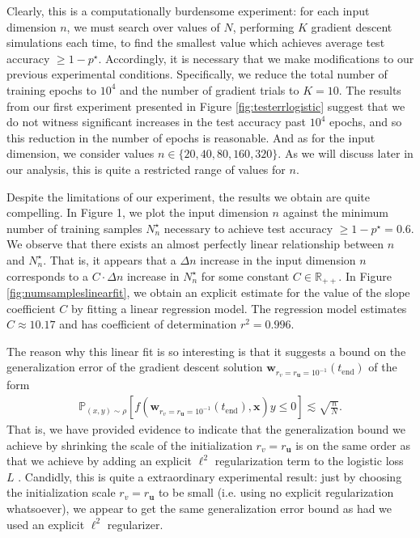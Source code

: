 \documentclass{article}
\begin{document}
Clearly, this is a computationally burdensome experiment: for each input dimension $n$, we must search over values of $N$, performing $K$ gradient descent simulations each time, to find the smallest value which achieves average test accuracy $\geq 1-p^{\star}$. Accordingly, it is necessary that we make modifications to our previous experimental conditions. Specifically, we reduce the total number of training epochs to $10^4$ and the number of gradient trials to $K = 10$. The results from our first experiment presented in Figure \ref{fig:testerrlogistic} suggest that we do not witness significant increases in the test accuracy past $10^4$ epochs, and so this reduction in the number of epochs is reasonable. And as for the input dimension, we consider values $n \in \{20, 40, 80, 160, 320\}$. As we will discuss later in our analysis, this is quite a restricted range of values for $n$.

Despite the limitations of our experiment, the results we obtain are quite compelling. In Figure 1, we plot the input dimension $n$ against the minimum number of training samples $N_n^{\star}$ necessary to achieve test accuracy $\geq 1-p^{\star} = 0.6$. We observe that there exists an almost perfectly linear relationship between $n$ and $N_n^{\star}$. That is, it appears that a $\Delta n$ increase in the input dimension $n$ corresponds to a $C \cdot \Delta n$ increase in $N_n^{\star}$ for some constant $C \in \mathbb{R}_{++}$. In Figure \ref{fig:numsampleslinearfit}, we obtain an explicit estimate for the value of the slope coefficient $C$ by fitting a linear regression model. The regression model estimates $C \approx 10.17$ and has coefficient of determination $r^2 = 0.996$.

The reason why this linear fit is so interesting is that it suggests a bound on the generalization error of the gradient descent solution $\boldsymbol{w}_{r_v = r_{\boldsymbol{u}}= 10^{-1}}(t_{\text{end}})$ of the form 
\begin{align*}
   \mathbb{P}_{(x,y) \sim \rho}[f(\boldsymbol{w}_{r_v = r_{\boldsymbol{u}} = 10^{-1}}(t_{\text{end}}), \boldsymbol{x})y \leq 0] \lesssim \sqrt{\frac{n}{N}}.
\end{align*}
That is, we have provided evidence to indicate that the generalization bound we achieve by shrinking the scale of the initialization $r_v = r_{\boldsymbol{u}}$ is on the same order as that we achieve by adding an explicit $\ell^2$ regularization term to the logistic loss $L$ \cite{wei2019regularization}. Candidly, this is quite a extraordinary experimental result: just by choosing the initialization scale $r_v = r_{\boldsymbol{u}}$ to be small (i.e. using no explicit regularization whatsoever), we appear to get the same generalization error bound as had we used an explicit $\ell^2$ regularizer.
\end{document}
